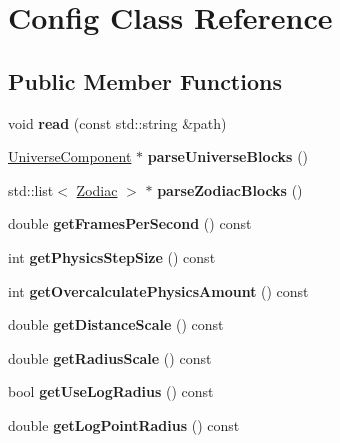 \hypertarget{classConfig}{}\section{Config Class Reference}
\label{classConfig}
\subsection*{Public Member Functions}
\begin{DoxyCompactItemize}
\item 
void {\bfseries read} (const std\+::string \&path)\hypertarget{classConfig_a73524943ef4dadd5e0dfd7ce118c26bf}{}\label{classConfig_a73524943ef4dadd5e0dfd7ce118c26bf}

\item 
\hyperlink{classUniverseComponent}{Universe\+Component} $\ast$ {\bfseries parse\+Universe\+Blocks} ()\hypertarget{classConfig_a0d9929daff1f0313c37112924532cc2e}{}\label{classConfig_a0d9929daff1f0313c37112924532cc2e}

\item 
std\+::list$<$ \hyperlink{classZodiac}{Zodiac} $>$ $\ast$ {\bfseries parse\+Zodiac\+Blocks} ()\hypertarget{classConfig_a7f6dd6aff9f561fb14f884eca32b1c14}{}\label{classConfig_a7f6dd6aff9f561fb14f884eca32b1c14}

\item 
double {\bfseries get\+Frames\+Per\+Second} () const\hypertarget{classConfig_a46fd73144acb372b17e3f8e81198c8a8}{}\label{classConfig_a46fd73144acb372b17e3f8e81198c8a8}

\item 
int {\bfseries get\+Physics\+Step\+Size} () const\hypertarget{classConfig_a7a55c8628d74484b182d0d9895e2568a}{}\label{classConfig_a7a55c8628d74484b182d0d9895e2568a}

\item 
int {\bfseries get\+Overcalculate\+Physics\+Amount} () const\hypertarget{classConfig_a0b00e58caf959e6ef2c19c96d5798b37}{}\label{classConfig_a0b00e58caf959e6ef2c19c96d5798b37}

\item 
double {\bfseries get\+Distance\+Scale} () const\hypertarget{classConfig_a63a31c1c57918c01ee3fb8134c427df1}{}\label{classConfig_a63a31c1c57918c01ee3fb8134c427df1}

\item 
double {\bfseries get\+Radius\+Scale} () const\hypertarget{classConfig_a6fe4db97750a726f288d6d4511857dbc}{}\label{classConfig_a6fe4db97750a726f288d6d4511857dbc}

\item 
bool {\bfseries get\+Use\+Log\+Radius} () const\hypertarget{classConfig_a62181b58313707d1c660ad451e92ba0d}{}\label{classConfig_a62181b58313707d1c660ad451e92ba0d}

\item 
double {\bfseries get\+Log\+Point\+Radius} () const\hypertarget{classConfig_a7b666265a00af475c965650fd6b71302}{}\label{classConfig_a7b666265a00af475c965650fd6b71302}

\end{DoxyCompactItemize}
